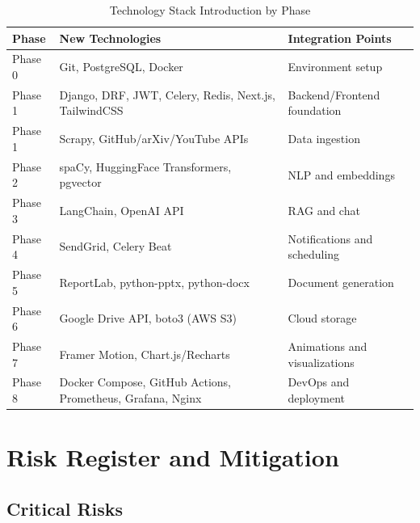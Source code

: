 \documentclass[12pt,oneside]{report}
\begin{document}
\begin{table}[h]
\centering
\caption{Technology Stack Introduction by Phase}
\begin{tabular}{|l|l|l|}
\hline
\rowcolor{lightorange}
\textbf{Phase} & \textbf{New Technologies} & \textbf{Integration Points} \\
\hline
Phase 0 & Git, PostgreSQL, Docker & Environment setup \\
\hline
Phase 1 & Django, DRF, JWT, Celery, Redis, Next.js, TailwindCSS & Backend/Frontend foundation \\
\hline
Phase 1 & Scrapy, GitHub/arXiv/YouTube APIs & Data ingestion \\
\hline
Phase 2 & spaCy, HuggingFace Transformers, pgvector & NLP and embeddings \\
\hline
Phase 3 & LangChain, OpenAI API & RAG and chat \\
\hline
Phase 4 & SendGrid, Celery Beat & Notifications and scheduling \\
\hline
Phase 5 & ReportLab, python-pptx, python-docx & Document generation \\
\hline
Phase 6 & Google Drive API, boto3 (AWS S3) & Cloud storage \\
\hline
Phase 7 & Framer Motion, Chart.js/Recharts & Animations and visualizations \\
\hline
Phase 8 & Docker Compose, GitHub Actions, Prometheus, Grafana, Nginx & DevOps and deployment \\
\hline
\end{tabular}
\end{table}

\chapter{Risk Register and Mitigation}

\section{Critical Risks}
\end{document}
